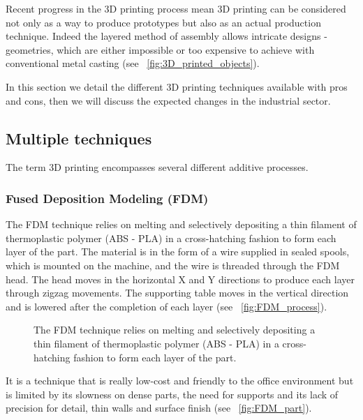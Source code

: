 Recent progress in the 3D printing process mean 3D printing can be considered not only as a way to produce prototypes but also as an actual production technique. Indeed the layered method of assembly allows intricate designs - geometries, which are either impossible or too expensive to achieve with conventional metal casting (see \figurename~\ref{fig:3D_printed_objects}).



In this section we detail the different 3D printing techniques available with pros and cons, then we will discuss the expected changes in the industrial sector.

\subsection{Multiple techniques} %

The term 3D printing encompasses several different additive processes.

\subsubsection{Fused Deposition Modeling (FDM)} %

The FDM technique relies on melting and selectively depositing a thin filament of thermoplastic polymer (ABS - PLA) in a cross-hatching fashion to form each layer of the part. The material is in the form of a wire supplied in sealed spools, which is mounted on the machine, and the wire is threaded through the FDM head. The head moves in the horizontal X and Y directions to produce each layer through zigzag movements. The supporting table moves in the vertical direction and is lowered after the completion of each layer (see \figurename~\ref{fig:FDM_process}).

\begin{figure}[tb]
    \centering
        \hfil
        \hfil
    \caption{The FDM technique relies on melting and selectively depositing a thin filament of thermoplastic polymer (ABS - PLA) in a cross-hatching fashion to form each layer of the part.}
    \label{fig:FDM_technique}
\end{figure}

It is a technique that is really low-cost and friendly to the office environment but is limited by its slowness on dense parts, the need for supports and its lack of precision for detail, thin walls and surface finish (see \figurename~\ref{fig:FDM_part}).


